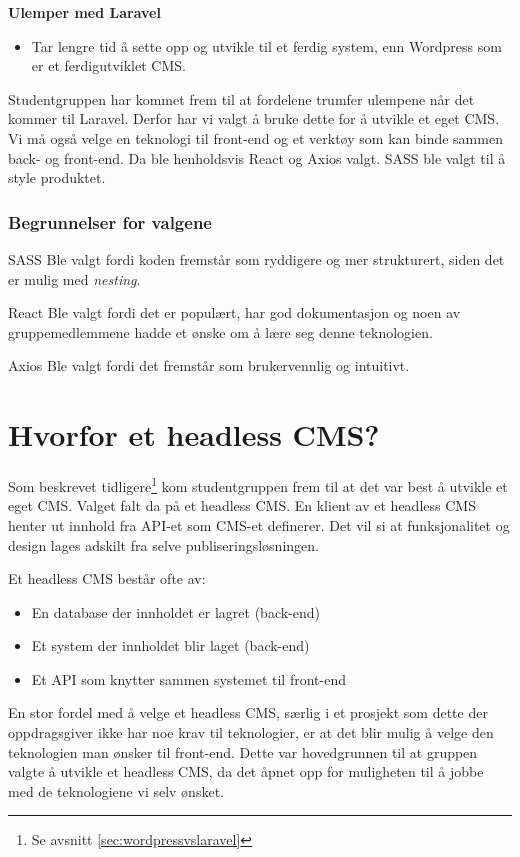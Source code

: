 \textbf{Ulemper med Laravel}
\begin{itemize}
    \item Tar lengre tid å sette opp og utvikle til et ferdig system, enn Wordpress som er et ferdigutviklet CMS.
\end{itemize}

Studentgruppen har kommet frem til at fordelene trumfer ulempene når det kommer til Laravel. Derfor har vi valgt å bruke dette for å utvikle et eget CMS. Vi må også velge en teknologi til front-end og et verktøy som kan binde sammen back- og front-end. Da ble henholdsvis React og Axios valgt. SASS ble valgt til å style produktet.

\subsubsection{Begrunnelser for valgene}
\begin{compactdesc}
\item[SASS] Ble valgt fordi koden fremstår som ryddigere og mer strukturert, siden det er mulig med \textit{nesting}.
\item[React] Ble valgt fordi det er populært, har god dokumentasjon og noen av gruppemedlemmene hadde et ønske om å lære seg denne teknologien.
\item[Axios] Ble valgt fordi det fremstår som brukervennlig og intuitivt.
\end{compactdesc}

\section{Hvorfor et headless CMS?}
Som beskrevet tidligere\footnote{Se avsnitt \ref{sec:wordpressvslaravel}} kom studentgruppen frem til at det var best å utvikle et eget CMS. Valget falt da på et headless CMS. En klient av et headless CMS henter ut innhold fra API-et som CMS-et definerer. Det vil si at funksjonalitet og design lages adskilt fra selve publiseringsløsningen.

Et headless CMS består ofte av:
\begin{itemize}
\item En database der innholdet er lagret (back-end)
\item Et system der innholdet blir laget (back-end)
\item Et API som knytter sammen systemet til front-end
\end{itemize}

En stor fordel med å velge et headless CMS, særlig i et prosjekt som dette der oppdragsgiver ikke har noe krav til teknologier, er at det blir mulig å velge den teknologien man ønsker til front-end. Dette var hovedgrunnen til at gruppen valgte å utvikle et headless CMS, da det åpnet opp for muligheten til å jobbe med de teknologiene vi selv ønsket.